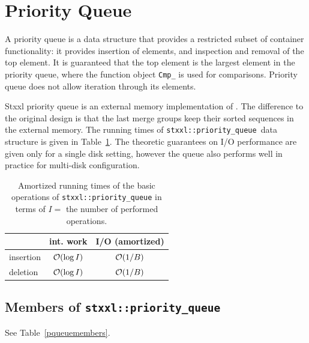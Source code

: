 \documentclass[twoside]{book}
\newcommand{\stxxl}{{\sc Stxxl} }
\begin{document}
\section{Priority Queue}
A priority queue is a data structure that provides a restricted subset of
container functionality: it provides insertion of elements, and
inspection and removal of the top element. It is guaranteed that the
top element is the largest element in the priority queue, where the
function object \texttt{Cmp\_} is used for comparisons.
Priority queue does not allow iteration through its elements. 

\newcommand{\xpqueue}{\texttt{stxxl::priority\_queue}}

\stxxl priority queue is an external memory implementation of
\cite{San00b}. The difference to the original design is that the
last merge groups keep their sorted sequences in the external memory.
The running times of \xpqueue\ data structure is given in
Table~\ref{rtpqueue}. The theoretic guarantees on I/O performance are
given only for a single disk setting, however the queue also performs
well in practice for multi-disk configuration.



\begin{table}[h]
\begin{center}
\caption{Amortized running times of the basic operations of \xpqueue{}
in terms of $I =$ the number of performed operations.}
\label{rtpqueue}
\begin{tabular}{|l|c|c|}
\hline
                    & int. work & I/O (amortized)\\
\hline\hline
insertion           & $\mathcal{O}\!\left( \log I\right)$ & $\mathcal{O}\!\left( 1/B\right)$\\
\hline
deletion  & $\mathcal{O}\!\left( \log I\right)$ & $\mathcal{O}\!\left( 1/B\right)$ \\
\hline
\end{tabular}
\end{center}
\end{table}

\subsection{Members of \xpqueue}
See Table~\ref{pqueuemembers}.
\end{document}
